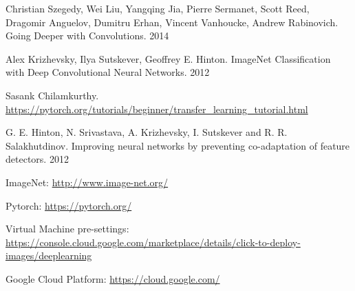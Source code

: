 \documentclass{article}
\begin{document}
\begin{thebibliography}{1}
	Christian Szegedy, Wei Liu, Yangqing Jia, Pierre Sermanet, Scott Reed, Dragomir Anguelov, Dumitru Erhan, Vincent Vanhoucke, Andrew Rabinovich. Going Deeper with Convolutions. 2014
	
	Alex Krizhevsky, Ilya Sutskever, Geoffrey E. Hinton. ImageNet Classification with Deep Convolutional
	Neural Networks. 2012

	Sasank Chilamkurthy.
	\url{https://pytorch.org/tutorials/beginner/transfer_learning_tutorial.html}
	
	G. E. Hinton, N. Srivastava, A. Krizhevsky, I. Sutskever and R. R. Salakhutdinov.
	Improving neural networks by preventing co-adaptation of feature detectors. 2012
	
	ImageNet: \url{http://www.image-net.org/}
	
	Pytorch: \url{https://pytorch.org/}
	
	Virtual Machine pre-settings: \url{https://console.cloud.google.com/marketplace/details/click-to-deploy-images/deeplearning}
	
	Google Cloud Platform: \url{https://cloud.google.com/}

	
\end{thebibliography}
\end{document}
